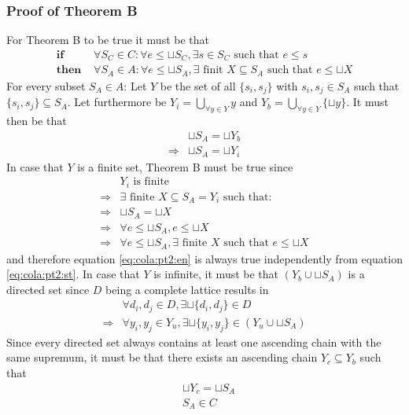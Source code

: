 \subsubsection{Proof of Theorem B}
For Theorem B to be true it must be that
\begin{align}
	\textbf{if }		& \forall S_C \in C: \forall e \leq \sqcup S_C,																	\label{eq:cola:pt2:st}
										\exists s \in S_C \text{ such that } e \leq s \\
	\textbf{then }	& \forall S_A \in A: \forall e \leq \sqcup S_A,
										\exists \text{ finit } X \subseteq S_A \text{ such that } e \leq \sqcup X			\label{eq:cola:pt2:en}
\end{align}
For every subset $S_A \in A$: Let $Y$ be the set of all $\{s_i,s_j\}$ with $s_i,s_j \in S_A$ such that $ \{s_i,s_j\} \subseteq S_A$. Let furthermore be $Y_i = \bigcup_{\forall y \in Y} y$ and $Y_b = \bigcup_{\forall y \in Y} \{\sqcup y\}$. It must then be that
\begin{align}
						& \sqcup S_A = \sqcup Y_b \\
\Rightarrow & \sqcup S_A = \sqcup Y_i
\end{align}
In case that $Y$ is a finite set, Theorem B must be true since
\begin{align}
						& Y_i \text{ is finite } \\
\Rightarrow	& \exists \text{ finite } X \subseteq S_A = Y_i \text{ such that:} \\
\Rightarrow & \sqcup S_A = \sqcup X \\
\Rightarrow & \forall e \leq \sqcup S_A, e \leq \sqcup X \\
\Rightarrow & \forall e \leq \sqcup S_A, \exists \text{ finite } X \text{ such that } e \leq \sqcup X
\end{align}
and therefore equation \ref{eq:cola:pt2:en} is always true independently from equation \ref{eq:cola:pt2:st}.
In case that $Y$ is infinite, it must be that $(Y_b \cup \sqcup S_A)$ is a directed set since $D$ being a complete lattice results in
\begin{align}
						& \forall d_i,d_j \in D, \exists \sqcup \{d_i,d_j\} \in D \\
\Rightarrow	&	\forall y_i,y_j \in Y_u, \exists \sqcup \{y_i,y_j\} \in (Y_u \cup \sqcup S_A)
\end{align}
Since every directed set always contains at least one ascending chain with the same supremum, it must be that there exists an ascending chain $Y_c \subseteq Y_b$ such that
\begin{align}
						& \sqcup Y_c = \sqcup S_A \\
						& S_A \in C
\end{align}
